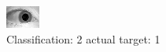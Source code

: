 \begin{figure}[h!]
\begin{center}
\includegraphics[width=0.60\columnwidth]{figures/ID1469_class_2_target_1.png}
\end{center}
\caption{ Classification: 2 actual target: 1}
\label{fig:ID1469_class_2_target_1}
\end{figure}
